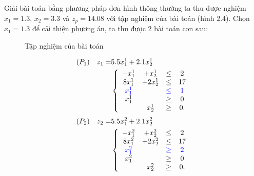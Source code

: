 \documentclass[12pt,a4paper]{report}
\begin{document}
    Giải bài toán bằng phương pháp đơn hình thông thường ta thu được nghiệm $x_1 =1.3$, $x_2 = 3.3$ và $z_p=14.08$ với tập nghiệm của bài toán (hình 2.4). Chọn $x_1=1.3$ để cải thiện phương án, ta thu được 2 bài toán con sau:
    \begin{figure}
	\center
    \caption{Tập nghiệm của bài toán}
    \end{figure}

    \begin{equation*}
        \begin{split}
            (P_1) \quad z_1= & 5.5x^1_1 + 2.1x^1_2 \\
            & \left\{\begin{array} {cccc}
            -x^1_1 &+ x^1_2 &\leq& 2 \\
            8x^1_1 &+ 2x^1_2 &\leq& 17 \\
            \color{blue} x^1_1 &&\color{blue}\leq&\color{blue} 1 \\
            x^1_1 &&\geq& 0 \\
            &x^1_2 &\geq& 0. \\
            \end{array}\right. \\
        \end{split}
    \end{equation*}
   \begin{equation*}
        \begin{split}
            (P_2) \quad z_2= & 5.5x^2_1 + 2.1x^2_2  \\
            & \left\{\begin{array} {cccc}
            -x^2_1 &+ x^2_2 &\leq &2 \\
            8x^2_1 &+ 2x^2_2 &\leq &17 \\
            \color{blue} x^2_1 &&\color{blue}\geq&\color{blue} 2 \\
            x^2_1 &&\geq& 0 \\
            &x^2_2 &\geq& 0. \\
            \end{array}\right. \\
        \end{split}
    \end{equation*}
\end{document}
